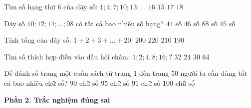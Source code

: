 \begin{ex} %
Tìm số hạng thứ 6 của dãy số: $1; 4; 7; 10; 13; \dots$
\choice
{\True $16$}
{$15$}
{$17$}
{$18$}
\end{ex}

\begin{ex} %
Dãy số $10; 12; 14; \dots; 98$ có tất cả bao nhiêu số hạng?
\choice
{$44$ số}
{$46$ số}
{$88$ số}
{\True $45$ số}
\end{ex}

\begin{ex} %
Tính tổng của dãy số: $1 + 2 + 3 + \dots + 20$.
\choice
{$200$}
{$220$}
{\True $210$}
{$190$}
\end{ex}

\begin{ex} %
Tìm số thích hợp điền vào dấu hỏi chấm: $1; 2; 4; 8; 16; ?$
\choice
{\True $32$}
{$24$}
{$30$}
{$64$}
\end{ex}

\begin{ex} %
Để đánh số trang một cuốn sách từ trang 1 đến trang 50 người ta cần dùng tất cả bao nhiêu chữ số?
\choice
{$90$ chữ số}
{$95$ chữ số}
{\True $91$ chữ số}
{$100$ chữ số}
\end{ex}

\textbf{Phần 2. Trắc nghiệm đúng sai}

